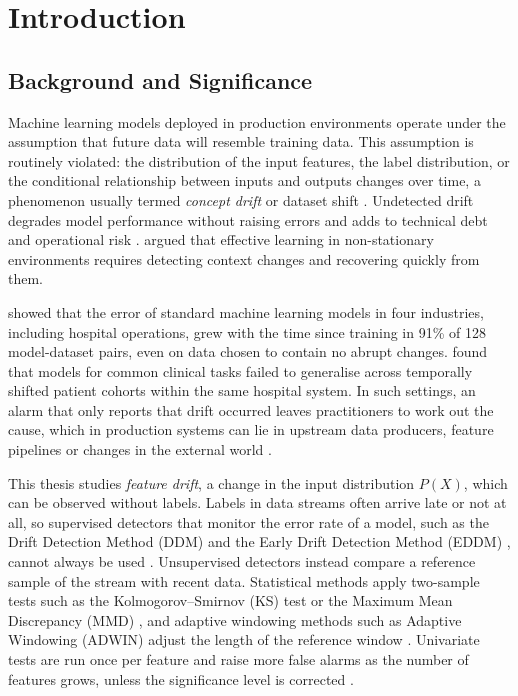 \chapter{Introduction} \label{chap:intro}

\section{Background and Significance}
Machine learning models deployed in production environments operate under the assumption that future data will resemble training data. This assumption is routinely violated: the distribution of the input features, the label distribution, or the conditional relationship between inputs and outputs changes over time, a phenomenon usually termed \textit{concept drift} or dataset shift \citep{Lu2018, Gama2014, Webb2016}. Undetected drift degrades model performance without raising errors and adds to technical debt and operational risk \citep{Sculley2015, Bayram2022}. \citet{WidmerKubat1996} argued that effective learning in non-stationary environments requires detecting context changes and recovering quickly from them.

\citet{Vela2022} showed that the error of standard machine learning models in four industries, including hospital operations, grew with the time since training in 91\% of 128 model-dataset pairs, even on data chosen to contain no abrupt changes. \citet{NestorEtAl2019} found that models for common clinical tasks failed to generalise across temporally shifted patient cohorts within the same hospital system. In such settings, an alarm that only reports that drift occurred leaves practitioners to work out the cause, which in production systems can lie in upstream data producers, feature pipelines or changes in the external world \citep{Sculley2015}.

This thesis studies \textit{feature drift}, a change in the input distribution $P(X)$, which can be observed without labels. Labels in data streams often arrive late or not at all, so supervised detectors that monitor the error rate of a model, such as the Drift Detection Method (DDM) and the Early Drift Detection Method (EDDM) \citep{Gama2004, BaenaGarcia2006}, cannot always be used \citep{Lu2018, Lukats2024}. Unsupervised detectors instead compare a reference sample of the stream with recent data. Statistical methods apply two-sample tests such as the Kolmogorov--Smirnov (KS) test or the Maximum Mean Discrepancy (MMD) \citep{Rabanser2019, Gretton2012}, and adaptive windowing methods such as Adaptive Windowing (ADWIN) adjust the length of the reference window \citep{BifetGavalda2007}. Univariate tests are run once per feature and raise more false alarms as the number of features grows, unless the significance level is corrected \citep{Rabanser2019}.

